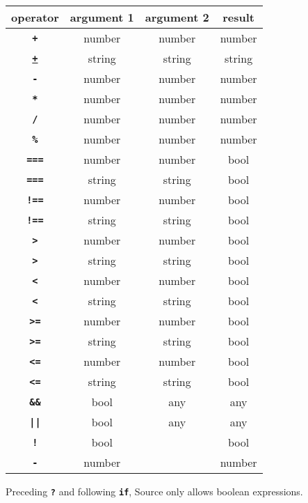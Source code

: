 \begin{center}
\begin{tabular}{c|c|c|c}
operator & argument 1 & argument 2 & result\\ \hline
\texttt{\textbf{+}} & number   & number     & number\\
\texttt{\href{https://sourceacademy.org/sicpjs/3.3.4\#p24}{\textbf{+}}} & string   & string     & string\\
\texttt{\textbf{-}} & number   & number     & number\\
\texttt{\textbf{*}} & number   & number     & number\\
\texttt{\textbf{/}} & number   & number     & number\\
\texttt{\textbf{\%}} & number   & number     & number\\
\texttt{\textbf{===}} & number   & number     & bool\\
\texttt{\textbf{===}} & string   & string     & bool\\
\texttt{\textbf{!==}} & number   & number     & bool\\
\texttt{\textbf{!==}} & string   & string     & bool\\
\texttt{\textbf{>}} & number   & number     & bool\\
\texttt{\textbf{>}} & string   & string     & bool\\
\texttt{\textbf{<}} & number   & number     & bool\\
\texttt{\textbf{<}} & string   & string     & bool\\
\texttt{\textbf{>=}} & number   & number     & bool\\
\texttt{\textbf{>=}} & string   & string     & bool\\
\texttt{\textbf{<=}}    & number   & number     & bool\\
\texttt{\textbf{<=}} & string   & string     & bool\\
\texttt{\textbf{\&\&}} & bool & any & any\\
\texttt{\textbf{||}}   & bool & any & any\\
\texttt{\textbf{!}}    & bool &      & bool\\
\texttt{\textbf{-}}    & number &    & number
\end{tabular}
\end{center}

Preceding \texttt{\textbf{?}} and following \texttt{\textbf{if}}, Source only allows
boolean expressions.

